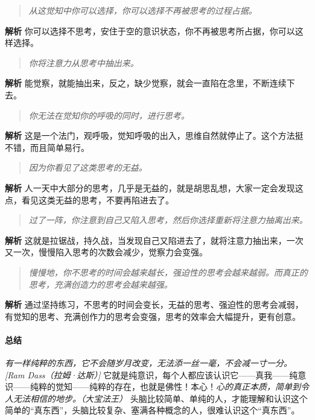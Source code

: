 \begin{quote}\it
    从这觉知中你可以选择，你可以选择不再被思考的过程占据。
\end{quote}

\textbf{解析} 你可以选择不思考，安住于空的意识状态，你不再被思考所占据，你可以这样选择。

\begin{quote}\it
    你将注意力从思考中抽出来。
\end{quote}

\textbf{解析} 能觉察，就能抽出来，反之，缺少觉察，就会一直陷在念里，不断连续下去。

\begin{quote}\it
    你无法在觉知你的呼吸的同时，进行思考。
\end{quote}

\textbf{解析} 这是一个法门，观呼吸，觉知呼吸的出入，思维自然就停止了。这个方法挺不错，而且简单易行。

\begin{quote}\it
    因为你看见了这类思考的无益。
\end{quote}

\textbf{解析} 人一天中大部分的思考，几乎是无益的，就是胡思乱想，大家一定会发现这点，看见这类无益的思考，不要再陷进去了。

\begin{quote}\it
    过了一阵，你注意到自己又陷入思考，然后你选择重新将注意力抽离出来。
\end{quote}

\textbf{解析} 这就是拉锯战，持久战，当发现自己又陷进去了，就将注意力抽出来，一次又一次，慢慢陷入思考的次数会减少，觉察力会变强。

\begin{quote}\it
    慢慢地，你不思考的时间会越来越长，强迫性的思考会越来越弱。而真正的思考，充满创造力的思考会越来越强。
\end{quote}

\textbf{解析} 通过坚持练习，不思考的时间会变长，无益的思考、强迫性的思考会减弱，有觉知的思考、充满创作力的思考会变强，思考的效率会大幅提升，更有创意。

\paragraph*{总结}

\textit{有一样纯粹的东西，它不会随岁月改变，无法添一丝一毫，不会减一寸一分。[Ram Dass（拉姆·达斯）]} 它就是纯意识，每个人都应该认识它——真我——纯意识——纯粹的觉知——纯粹的存在，也就是佛性！本心！\textit{心的真正本质，简单到令人无法相信的地步。（大宝法王）} 头脑比较简单、单纯的人，才能理解和认识这个简单的“真东西”，头脑比较复杂、塞满各种概念的人，很难认识这个“真东西”。

